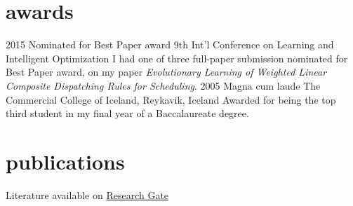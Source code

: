 \documentclass[]{cv} %
\begin{document}
\section{awards}
\begin{entrylist}
	\entry
	{2015}
	{Nominated for Best Paper award}
	{9th Int'l Conference on Learning and Intelligent Optimization}
	{I had one of three full-paper submission nominated for Best Paper award, 
		on my 
		paper \emph{Evolutionary Learning of Weighted Linear Composite 
			Dispatching 
			Rules for Scheduling}.}
	\entry
	{2005}
	{Magna cum laude}
	{The Commercial College of Iceland, Reykavik, Iceland}
	{Awarded for being the top third student in my final year of a 
		Baccalaureate degree.}
\end{entrylist}

\section{publications}

{Literature available on 
\href{https://www.researchgate.net/profile/Helga_Ingimundardottir}{{\boldfont 
Research Gate}}}
\nocite{*}

\printbibliography[type=misc, title={seminars}, heading=subbibliography]


\end{document}
